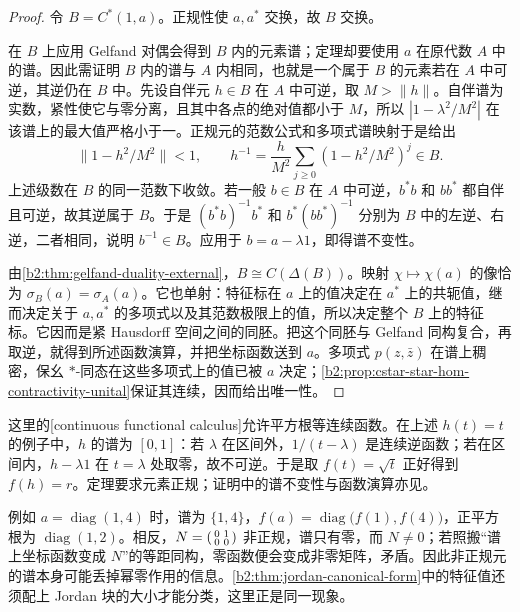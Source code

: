 \begin{proof}
	令 \(B=C^*(1,a)\)。正规性使 \(a,a^*\) 交换，故 \(B\) 交换。

	在 \(B\) 上应用 Gelfand 对偶会得到 \(B\) 内的元素谱；定理却要使用 \(a\) 在原代数 \(A\) 中的谱。因此需证明 \(B\) 内的谱与 \(A\) 内相同，也就是一个属于 \(B\) 的元素若在 \(A\) 中可逆，其逆仍在 \(B\) 中。先设自伴元 \(h\in B\) 在 \(A\) 中可逆，取 \(M>\|h\|\)。自伴谱为实数，紧性使它与零分离，且其中各点的绝对值都小于 \(M\)，所以 \(|1-\lambda^2/M^2|\) 在该谱上的最大值严格小于一。正规元的范数公式和多项式谱映射于是给出
	\[
		\|1-h^2/M^2\|<1,\qquad h^{-1}=\frac h{M^2}\sum_{j\ge0}(1-h^2/M^2)^j\in B.
	\]
	上述级数在 \(B\) 的同一范数下收敛。若一般 \(b\in B\) 在 \(A\) 中可逆，\(b^*b\) 和 \(bb^*\) 都自伴且可逆，故其逆属于 \(B\)。于是 \((b^*b)^{-1}b^*\) 和 \(b^*(bb^*)^{-1}\) 分别为 \(B\) 中的左逆、右逆，二者相同，说明 \(b^{-1}\in B\)。应用于 \(b=a-\lambda1\)，即得谱不变性。

	由\cref{b2:thm:gelfand-duality-external}，\(B\cong C(\Delta(B))\)。映射 \(\chi\mapsto\chi(a)\) 的像恰为 \(\sigma_B(a)=\sigma_A(a)\)。它也单射：特征标在 \(a\) 上的值决定在 \(a^*\) 上的共轭值，继而决定关于 \(a,a^*\) 的多项式以及其范数极限上的值，所以决定整个 \(B\) 上的特征标。它因而是紧 Hausdorff 空间之间的同胚。把这个同胚与 Gelfand 同构复合，再取逆，就得到所述函数演算，并把坐标函数送到 \(a\)。多项式 \(p(z,\bar z)\) 在谱上稠密，保幺 \(*\)-同态在这些多项式上的值已被 \(a\) 决定；\cref{b2:prop:cstar-star-hom-contractivity-unital}保证其连续，因而给出唯一性。
\end{proof}

这里的[continuous functional calculus]允许平方根等连续函数。在上述 \(h(t)=t\) 的例子中，\(h\) 的谱为 \([0,1]\)：若 \(\lambda\) 在区间外，\(1/(t-\lambda)\) 是连续逆函数；若在区间内，\(h-\lambda1\) 在 \(t=\lambda\) 处取零，故不可逆。于是取 \(f(t)=\sqrt t\) 正好得到 \(f(h)=r\)。定理要求元素正规；证明中的谱不变性与函数演算亦见\cite[\nopp II.1.6.7; Corollary II.2.3.1]{Blackadar2017OperatorAlgebrasCorrected}。

\ProseParagraphBreak
例如 \(a=\operatorname{diag}(1,4)\) 时，谱为 \(\{1,4\}\)，\(f(a)=\operatorname{diag}\bigl(f(1),f(4)\bigr)\)，正平方根为 \(\operatorname{diag}(1,2)\)。相反，\(N=\begin{psmallmatrix}0&1\\0&0\end{psmallmatrix}\) 非正规，谱只有零，而 \(N\ne0\)；若照搬“谱上坐标函数变成 \(N\)”的等距同构，零函数便会变成非零矩阵，矛盾。因此非正规元的谱本身可能丢掉幂零作用的信息。\cref{b2:thm:jordan-canonical-form}中的特征值还须配上 Jordan 块的大小才能分类，这里正是同一现象。

